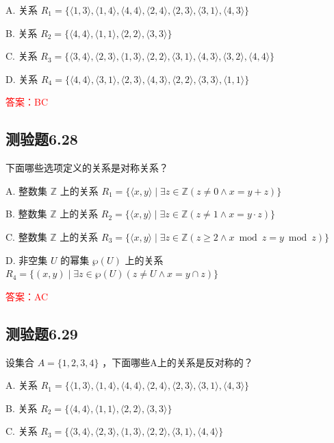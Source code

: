 \documentclass[UTF8, heading=true]{ctexart}
\begin{document}
A. 
关系 $R_1=\{\langle 1,3\rangle,\langle 1,4\rangle,\langle 4,4\rangle,\langle 2,4\rangle,\langle 2,3\rangle,\langle 3,1\rangle,\langle 4,3\rangle\}$

B. 
关系 $R_2=\{\langle 4,4\rangle,\langle 1,1\rangle,\langle 2,2\rangle,\langle 3,3\rangle\}$

C. 
关系 $R_3=\{\langle 3,4\rangle,\langle 2,3\rangle,\langle 1,3\rangle,\langle 2,2\rangle,\langle 3,1\rangle,\langle 4,3\rangle,\langle 3,2\rangle,\langle 4,4\rangle\}$

D. 
关系 $R_4=\{\langle 4,4\rangle,\langle 3,1\rangle,\langle 2,3\rangle,\langle 4,3\rangle,\langle 2,2\rangle,\langle 3,3\rangle,\langle 1,1\rangle\}$



\textcolor{red}{答案：BC}

\subsection{测验题6.28}

下面哪些选项定义的关系是对称关系？

A. 整数集 $\mathbb{Z}$ 上的关系 $R_1=\{\langle x, y\rangle \mid \exists z \in \mathbb{Z}(z \neq 0 \wedge x=y+z)\}$

B. 整数集 $\mathbb{Z}$ 上的关系 $R_2=\{\langle x, y\rangle \mid \exists z \in \mathbb{Z}(z \neq 1 \wedge x=y \cdot z)\}$

C. 整数集 $\mathbb{Z}$ 上的关系 $R_3=\{\langle x, y\rangle \mid \exists z \in \mathbb{Z}(z \geq 2 \wedge x \bmod z=y \bmod z)\}$

D. 非空集 $U$ 的幂集 $\wp(U)$ 上的关系 $R_4=\{(x, y) \mid \exists z \in \wp(U)(z \neq U \wedge x=y \cap z)\}$

\textcolor{red}{答案：AC}

\subsection{测验题6.29}


设集合 $A=\{1,2,3,4\}$ ，下面哪些A上的关系是反对称的？

A. 关系 $R_1 = \{\langle 1,3\rangle, \langle 1,4\rangle, \langle 4,4\rangle, \langle 2,4\rangle, \langle 2,3\rangle, \langle 3,1\rangle, \langle 4,3\rangle\}$

B. 关系 $R_2 = \{\langle 4,4\rangle, \langle 1,1\rangle, \langle 2,2\rangle, \langle 3,3\rangle\}$

C. 关系 $R_3 = \{\langle 3,4\rangle, \langle 2,3\rangle, \langle 1,3\rangle, \langle 2,2\rangle, \langle 3,1\rangle, \langle 4,4\rangle\}$
\end{document}
